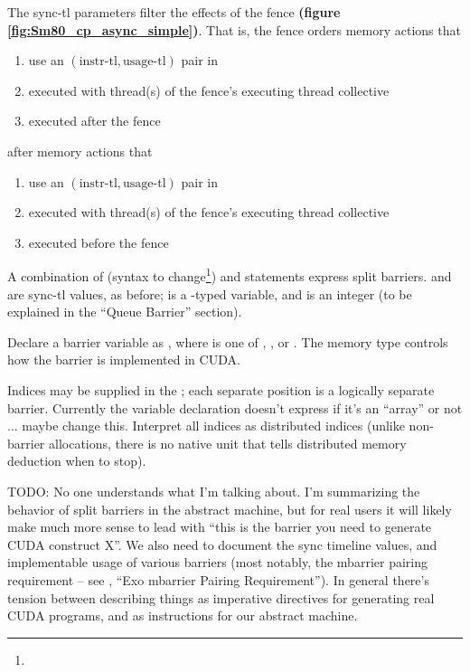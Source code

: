 \filbreak 
The sync-tl parameters filter the effects of the fence \textbf{(figure \ref{fig:Sm80_cp_async_simple})}.
That is, the fence orders memory actions that
\begin{enumerate}
  \item use an $(\text{instr-tl}, \text{usage-tl})$ pair in 
  \item executed with thread(s) of the fence's executing thread collective
  \item executed after the fence
\end{enumerate}
\filbreak
after memory actions that
\begin{enumerate}
  \item use an $(\text{instr-tl}, \text{usage-tl})$ pair in 
  \item executed with thread(s) of the fence's executing thread collective
  \item executed before the fence
\end{enumerate}

\filbreak
{}

A combination of  (syntax to change\footnote{}) and  statements express split barriers.
 and  are sync-tl values, as before;  is a -typed variable, and  is an integer (to be explained in the ``Queue Barrier'' section).

\filbreak
Declare a barrier variable as , where  is one of , , or .
The memory type controls how the barrier is implemented in CUDA.

\filbreak
Indices may be supplied in the ; each separate position is a logically separate barrier.
Currently the  variable declaration doesn't express if it's an ``array'' or not ... maybe change this.
Interpret all indices as distributed indices (unlike non-barrier allocations, there is no native unit that tells distributed memory deduction when to stop).

\filbreak
TODO: No one understands what I'm talking about.
I'm summarizing the behavior of split barriers in the abstract machine, but for real users it will likely make much more sense to lead with ``this is the barrier you need to generate CUDA construct X''.
We also need to document the sync timeline values, and implementable usage of various barriers (most notably, the mbarrier pairing requirement -- see , ``Exo mbarrier Pairing Requirement'').
In general there's tension between describing things as imperative directives for generating real CUDA programs, and as instructions for our abstract machine.

